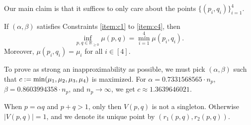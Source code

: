 Our main claim is that it suffices to only care about the points $\{(p_i, q_i)\}_{i=1}^4$.

\begin{lemma}
\label{thm:pq-redn}
If $(\alpha, \beta)$ satisfies Constraints \ref{item:c1} to \ref{item:c4}, then
\[ \inf_{p,q \in \mathbb{R}_{\ge 0}} \mu(p, q) = \min_{i=1}^4 \mu(p_i, q_i). \]
Moreover, $\mu(p_i, q_i) = \mu_i$ for all $i \in [4]$.
\end{lemma}

To prove as strong an inapproximability as possible,
we must pick $(\alpha, \beta)$ such that $c := \min(\mu_1, \mu_2, \mu_3, \mu_4)$ is maximized.
For $\alpha = 0.7331568565 \cdot n_p$, $\beta = 0.8603994358 \cdot n_p$, and $n_p \to \infty$,
we get $c \approx 1.3639646021$.

When $p = \alpha q$ and $p + q > 1$, only then $V(p, q)$ is not a singleton.
Otherwise $|V(p, q)| = 1$, and we denote its unique point by $(r_1(p, q), r_2(p, q))$.
